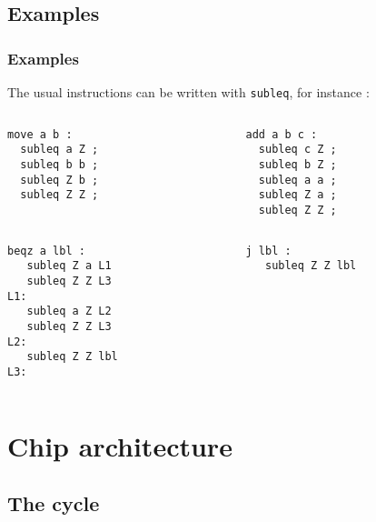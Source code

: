 \documentclass[slidestop]{beamer}
\begin{document}
\subsection{Examples}
\begin{frame}[fragile]
    \frametitle{Examples}
The usual instructions can be written with \texttt{subleq}, for instance :

\begin{columns}[t]
    \begin{column}[T]{5cm}
\begin{lstlisting}
move a b :
  subleq a Z ;
  subleq b b ;
  subleq Z b ;
  subleq Z Z ;

\end{lstlisting}
    \end{column}
    \begin{column}[T]{5cm}
\begin{lstlisting}
add a b c :
  subleq c Z ;
  subleq b Z ;
  subleq a a ;
  subleq Z a ;
  subleq Z Z ;
\end{lstlisting}
\end{column}
\end{columns}

\begin{columns}[t]
\begin{column}[T]{5cm}
\begin{lstlisting}
beqz a lbl :
   subleq Z a L1
   subleq Z Z L3
L1:
   subleq a Z L2
   subleq Z Z L3
L2:
   subleq Z Z lbl
L3:
\end{lstlisting}
\end{column}
\begin{column}[T]{5cm}
\begin{lstlisting}
j lbl :
   subleq Z Z lbl
\end{lstlisting}
\end{column}
\end{columns}
\end{frame}

\section{Chip architecture}
\subsection{The cycle}
\end{document}

